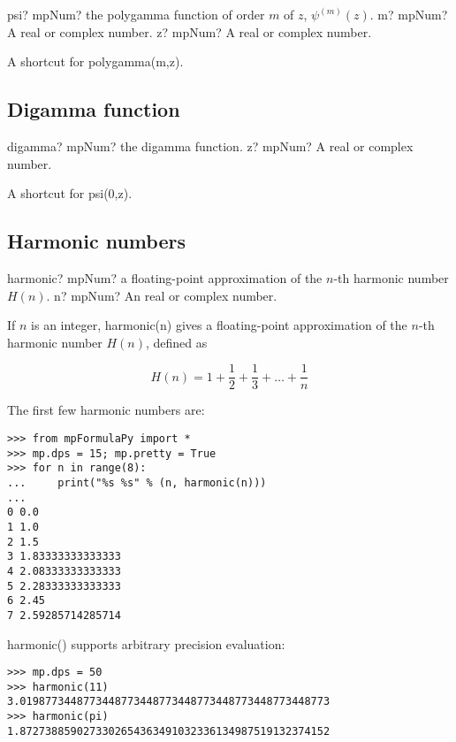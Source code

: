 \begin{mpFunctionsExtract}
	\mpFunctionTwo
	{psi? mpNum? the polygamma function of order $m$ of $z$, $\psi^{(m)}(z)$.}
	{m? mpNum? A real or complex number.}
	{z? mpNum? A real or complex number.}	
\end{mpFunctionsExtract}

\vpara
A shortcut for polygamma(m,z).



\subsection{Digamma function}


\begin{mpFunctionsExtract}
	\mpFunctionOne
	{digamma? mpNum? the digamma function.}
	{z? mpNum? A real or complex number.}	
\end{mpFunctionsExtract}

\vpara
A shortcut for psi(0,z).


\subsection{Harmonic numbers}


\begin{mpFunctionsExtract}
	\mpFunctionOne
	{harmonic? mpNum? a floating-point approximation of the $n$-th harmonic number $H(n)$.}
	{n? mpNum? An  real or complex number.}	
\end{mpFunctionsExtract}


\vpara
If $n$ is an integer, harmonic(n) gives a floating-point approximation of the $n$-th harmonic number $H(n)$, defined as

\begin{equation}
H(n) = 1 + \frac{1}{2}+ \frac{1}{3} + \ldots + \frac{1}{n}
\end{equation}

The first few harmonic numbers are:


\begin{lstlisting}
>>> from mpFormulaPy import *
>>> mp.dps = 15; mp.pretty = True
>>> for n in range(8):
...     print("%s %s" % (n, harmonic(n)))
...
0 0.0
1 1.0
2 1.5
3 1.83333333333333
4 2.08333333333333
5 2.28333333333333
6 2.45
7 2.59285714285714
\end{lstlisting}

harmonic() supports arbitrary precision evaluation:
\begin{lstlisting}
>>> mp.dps = 50
>>> harmonic(11)
3.0198773448773448773448773448773448773448773448773
>>> harmonic(pi)
1.8727388590273302654363491032336134987519132374152
\end{lstlisting}







